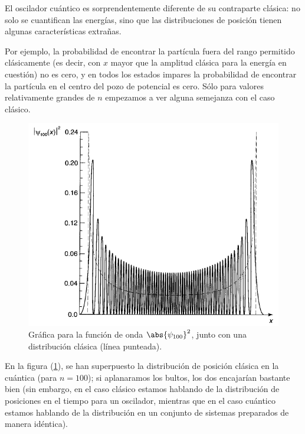 \newpage
El oscilador cuántico es sorprendentemente diferente de su contraparte clásica: no solo se cuantifican las energías, sino que las distribuciones de posición tienen algunas características extrañas. 
\par
Por ejemplo, la probabilidad de encontrar la partícula fuera del rango permitido clásicamente (es decir, con $x$ mayor que la amplitud clásica para la energía en cuestión) no es cero, y en todos los estados impares la probabilidad de encontrar la partícula en el centro del pozo de potencial es cero. Sólo para valores relativamente grandes de $n$ empezamos a ver alguna semejanza con el caso clásico. 
\begin{figure}[H]
    \centering
    \includegraphics[scale=0.5]{Imagenes/Funcion_Onda_100.png}
    \caption{Gráfica para la función de onda $\abs{\psi_{100}}^{2}$, junto con una distribución clásica (línea punteada).}
    \label{figura_004}
\end{figure}
En la figura (\ref{figura_004}), se han superpuesto la distribución de posición clásica en la cuántica (para $n = 100$); si aplanaramos los bultos, los dos encajarían bastante bien (sin embargo, en el caso clásico estamos hablando de la distribución de posiciones en el tiempo para un oscilador, mientras que en el caso cuántico estamos hablando de la distribución en un conjunto de sistemas preparados de manera idéntica).
